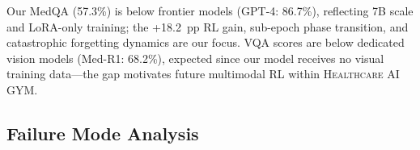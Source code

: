 \documentclass{article}
\newcommand{\gym}{\textsc{Healthcare AI GYM}}
\begin{document}
\begin{table}[t]
\centering
\caption{Contextualization against published medical RL results. All numbers are exact-match accuracy (\%) unless noted. $^\dagger$Results on different evaluation splits or prompting strategies; direct comparison is approximate. Our contribution is the controlled multi-algorithm comparison, not absolute SOTA.}
\label{tab:sota_context}
\end{table}

Our MedQA (57.3\%) is below frontier models (GPT-4: 86.7\%), reflecting 7B scale and LoRA-only training; the +18.2~pp RL gain, sub-epoch phase transition, and catastrophic forgetting dynamics are our focus. VQA scores are below dedicated vision models (Med-R1: 68.2\%), expected since our model receives no visual training data---the gap motivates future multimodal RL within \gym{}.

\subsection{Failure Mode Analysis}
\end{document}
